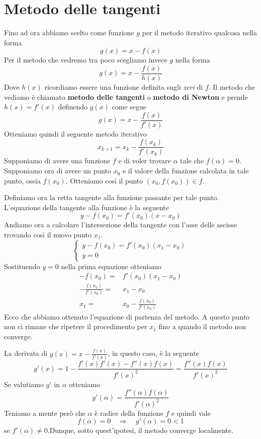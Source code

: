 \section{Metodo delle tangenti}
Fino ad ora abbiamo scelto come funzione $g$ per il metodo iterativo qualcosa nella forma
\[ g(x) = x - f(x) \]
Per il metodo che vedremo tra poco scegliamo invece $g$ nella forma
\[ g(x) = x - \frac{f(x)}{h(x)} \]
Dove $h(x)$ ricordiamo essere una funzione definita sugli \emph{zeri} di $f$. Il metodo che vediamo
è chiamato \textbf{metodo delle tangenti} o \textbf{metodo di Newton} e prende $h(x) = f'(x)$
definendo $g(x)$ come segue
\[ g(x) = x - \frac{f(x)}{f'(x)} \]
Otteniamo quindi il seguente metodo iterativo
\[ x_{k+1} = x_k - \frac{f(x_k)}{f'(x_k)} \]
Supponiamo di avere una funzione $f$ e di voler trovare $\alpha$ tale che $f(\alpha) = 0$.
Supponiamo ora di avere un punto $x_0$ e il valore della funzione calcolata in tale punto, ossia
$f(x_0)$. Otteniamo così il punto $(x_0, f(x_0)) \in f$.

Definiamo ora la retta tangente alla funzione passante per tale punto. L'equazione della tangente
alla funzione è la seguente
\[ y - f(x_0) = f'(x_0)(x - x_0) \]
Andiamo ora a calcolare l'intersezione della tangente con l'asse delle ascisse trovando così il
nuovo punto $x_1$.
\[
	\begin{cases}
		y - f(x_0) = f'(x_0)(x_1 - x_0) \\
		y = 0
	\end{cases}
\]
Sostituendo $y = 0$ nella prima equazione otteniamo
\begin{align*}
	-f(x_0) =                 & f'(x_0)(x_1 - x_0)           \\
	-\frac{f(x_0)}{f'(x_0)} = & x_1 - x_0                    \\
	x_1 =                     & x_0 - \frac{f(x_0)}{f'(x_0)}
\end{align*}
Ecco che abbiamo ottenuto l'equazione di partenza del metodo. A questo punto non ci rimane che
ripetere il procedimento per $x_1$ fino a quando il metodo non converge.

La derivata di $g(x) = x - \frac{f(x)}{f'(x)}$, in questo caso, è la seguente
\[ g'(x) = 1 - \frac{f'(x) f'(x) - f''(x) f(x)}{f'(x)^2} = \frac{f''(x) f(x)}{f'(x)^2} \]
Se valutiamo $g'$ in $\alpha$ otteniamo
\[ g'(\alpha) = \frac{f''(\alpha) f(\alpha)}{f'(\alpha)^2} \]
Teniamo a mente però che $\alpha$ è radice della funzione $f$ e quindi vale
\[ f(\alpha) = 0 \quad \Rightarrow \quad g'(\alpha) = 0 < 1 \]
se $f'(\alpha) \neq 0$.Dunque, sotto quest'ipotesi, il metodo converge localmente.

